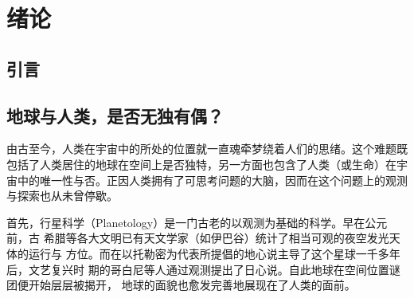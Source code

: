 \chapter{绪论} \label{chapter:intro}

\section{引言}

\section{地球与人类，是否无独有偶？}

由古至今，人类在宇宙中的所处的位置就一直魂牵梦绕着人们的思绪。这个难题既
包括了人类居住的地球在空间上是否独特，另一方面也包含了人类（或生命）在宇
宙中的唯一性与否。正因人类拥有了可思考问题的大脑，因而在这个问题上的观测
与探索也从未曾停歇。

首先，行星科学（Planetology）是一门古老的以观测为基础的科学。早在公元前，古
希腊等各大文明已有天文学家（如伊巴谷）统计了相当可观的夜空发光天体的运行与
方位。而在以托勒密为代表所提倡的地心说主导了这个星球一千多年后，文艺复兴时
期的哥白尼等人通过观测提出了日心说。自此地球在空间位置谜团便开始层层被揭开，
地球的面貌也愈发完善地展现在了人类的面前。


